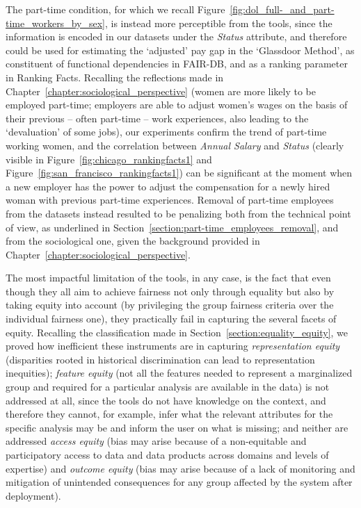 The part-time condition, for which we recall Figure~\ref{fig:dol_full-_and_part-time_workers_by_sex}, is instead more perceptible from the tools, since the information is encoded in our datasets under the \textit{Status} attribute, and therefore could be used for estimating the `adjusted' pay gap in the `Glassdoor Method', as constituent of functional dependencies in FAIR-DB, and as a ranking parameter in Ranking Facts. Recalling the reflections made in Chapter~\ref{chapter:sociological_perspective} (women are more likely to be employed part-time; employers are able to adjust women's wages on the basis of their previous -- often part-time -- work experiences, also leading to the `devaluation' of some jobs), our experiments confirm the trend of part-time working women, and the correlation between \textit{Annual Salary} and \textit{Status} (clearly visible in Figure~\ref{fig:chicago_rankingfacts1} and Figure~\ref{fig:san_francisco_rankingfacts1}) can be significant at the moment when a new employer has the power to adjust the compensation for a newly hired woman with previous part-time experiences.
Removal of part-time employees from the datasets instead resulted to be penalizing both from the technical point of view, as underlined in Section~\ref{section:part-time_employees_removal}, and from the sociological one, given the background provided in Chapter~\ref{chapter:sociological_perspective}.

The most impactful limitation of the tools, in any case, is the fact that even though they all aim to achieve fairness not only through equality but also by taking equity into account (by privileging the group fairness criteria over the individual fairness one), they practically fail in capturing the several facets of equity. Recalling the classification made in Section~\ref{section:equality_equity}, we proved how inefficient these instruments are in capturing \textit{representation equity} (disparities rooted in historical discrimination can lead to representation inequities); \textit{feature equity} (not all the features needed to represent a marginalized group and required for a particular analysis are available in the data) is not addressed at all, since the tools do not have knowledge on the context, and therefore they cannot, for example, infer what the relevant attributes for the specific analysis may be and inform the user on what is missing; and neither are addressed \textit{access equity} (bias may arise because of a non-equitable and participatory access to data and data products across domains and levels of expertise) and \textit{outcome equity} (bias may arise because of a lack of monitoring and mitigation of unintended consequences for any group affected by the system after deployment).

